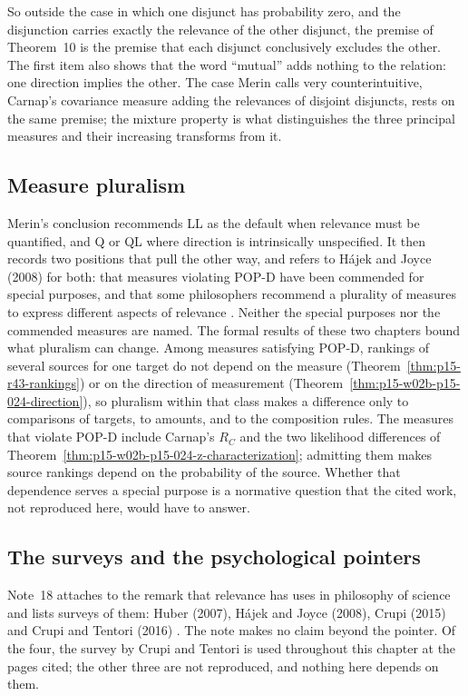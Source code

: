 So outside the case in which one disjunct has probability zero, and
the disjunction carries exactly the relevance of the other disjunct,
the premise of Theorem~10 is the premise that each disjunct
conclusively excludes the other. The first item also shows that the
word ``mutual'' adds nothing to the relation: one direction implies the
other. The case Merin calls very counterintuitive, Carnap's covariance
measure adding the relevances of disjoint disjuncts, rests on the same
premise; the mixture property is what distinguishes the three principal
measures and their increasing transforms from it.

\subsection{Measure pluralism}
\label{sec:p15-w02b-p15-024-pluralism}

Merin's conclusion recommends LL as the default when relevance must be
quantified, and Q or QL where direction is intrinsically unspecified.
It then records two positions that pull the other way, and refers to
H\'ajek and Joyce (2008) for both: that measures violating POP-D have
been commended for special purposes, and that some philosophers
recommend a plurality of measures to express different aspects of
relevance \cite[p.~274]{Merin2021Relevance}. Neither the special
purposes nor the commended measures are named. The formal results of
these two chapters bound what pluralism can change. Among measures
satisfying POP-D, rankings of several sources for one target do not
depend on the measure (Theorem~\ref{thm:p15-r43-rankings}) or on the
direction of measurement
(Theorem~\ref{thm:p15-w02b-p15-024-direction}), so pluralism within
that class makes a difference only to comparisons of targets, to
amounts, and to the composition rules. The measures that violate POP-D
include Carnap's \(R_C\) and the two likelihood differences of
Theorem~\ref{thm:p15-w02b-p15-024-z-characterization}; admitting them
makes source rankings depend on the probability of the source.
Whether that dependence serves a special purpose is a normative
question that the cited work, not reproduced here, would have to
answer.

\subsection{The surveys and the psychological pointers}
\label{sec:p15-w02b-p15-024-surveys}

Note~18 attaches to the remark that relevance has uses in philosophy of
science and lists surveys of them: Huber (2007), H\'ajek and Joyce
(2008), Crupi (2015) and Crupi and Tentori (2016)
\cite[p.~273 and p.~274, n.~18]{Merin2021Relevance}. The note makes no
claim beyond the pointer. Of the four, the survey by Crupi and Tentori
is used throughout this chapter at the pages cited; the other three are
not reproduced, and nothing here depends on them.

